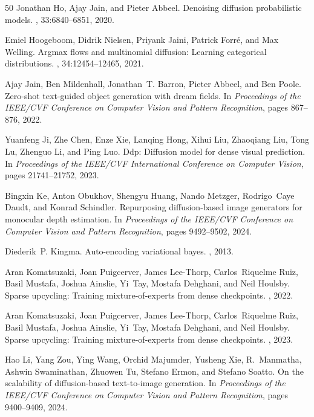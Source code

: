 \documentclass[manuscript,screen,review]{acmart}
\begin{document}
\begin{thebibliography}{50}
Jonathan Ho, Ajay Jain, and Pieter Abbeel.
\newblock Denoising diffusion probabilistic models.
, 33:6840--6851, 2020.

Emiel Hoogeboom, Didrik Nielsen, Priyank Jaini, Patrick Forr{\'e}, and Max Welling.
\newblock Argmax flows and multinomial diffusion: Learning categorical distributions.
, 34:12454--12465, 2021.

Ajay Jain, Ben Mildenhall, Jonathan~T. Barron, Pieter Abbeel, and Ben Poole.
\newblock Zero-shot text-guided object generation with dream fields.
\newblock In {\em Proceedings of the IEEE/CVF Conference on Computer Vision and Pattern Recognition}, pages 867--876, 2022.

Yuanfeng Ji, Zhe Chen, Enze Xie, Lanqing Hong, Xihui Liu, Zhaoqiang Liu, Tong Lu, Zhenguo Li, and Ping Luo.
\newblock Ddp: Diffusion model for dense visual prediction.
\newblock In {\em Proceedings of the IEEE/CVF International Conference on Computer Vision}, pages 21741--21752, 2023.

Bingxin Ke, Anton Obukhov, Shengyu Huang, Nando Metzger, Rodrigo~Caye Daudt, and Konrad Schindler.
\newblock Repurposing diffusion-based image generators for monocular depth estimation.
\newblock In {\em Proceedings of the IEEE/CVF Conference on Computer Vision and Pattern Recognition}, pages 9492--9502, 2024.

Diederik~P. Kingma.
\newblock Auto-encoding variational bayes.
, 2013.

Aran Komatsuzaki, Joan Puigcerver, James Lee-Thorp, Carlos~Riquelme Ruiz, Basil Mustafa, Joshua Ainslie, Yi~Tay, Mostafa Dehghani, and Neil Houlsby.
\newblock Sparse upcycling: Training mixture-of-experts from dense checkpoints.
, 2022.

Aran Komatsuzaki, Joan Puigcerver, James Lee-Thorp, Carlos~Riquelme Ruiz, Basil Mustafa, Joshua Ainslie, Yi~Tay, Mostafa Dehghani, and Neil Houlsby.
\newblock Sparse upcycling: Training mixture-of-experts from dense checkpoints.
, 2023.

Hao Li, Yang Zou, Ying Wang, Orchid Majumder, Yusheng Xie, R.~Manmatha, Ashwin Swaminathan, Zhuowen Tu, Stefano Ermon, and Stefano Soatto.
\newblock On the scalability of diffusion-based text-to-image generation.
\newblock In {\em Proceedings of the IEEE/CVF Conference on Computer Vision and Pattern Recognition}, pages 9400--9409, 2024.


\end{thebibliography}
\end{document}
